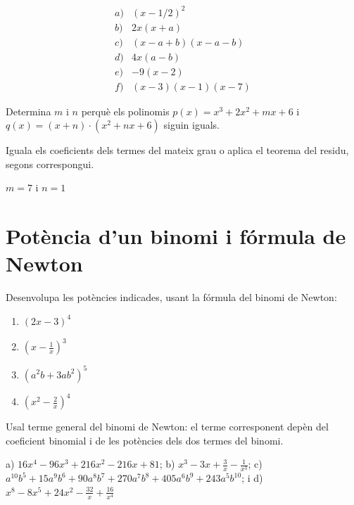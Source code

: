 \begin{solucio}
\[
\begin{array}{ll}
a) & (x-1/2)^{2} \\
b) & 2x(x+a) \\
c) & (x-a+b)(x-a-b) \\
d) & 4x(a-b) \\
e) & -9(x-2) \\
f) & (x-3)(x-1)(x-7)
\end{array}
\]
\end{solucio}

\begin{exercici}
Determina $m$ i $n$ perquè els polinomis $p(x)=x^{3}+2x^{2}+mx+6$ i
$q(x)=(x+n)\cdot (x^{2}+nx+6)$ siguin iguals.
\end{exercici}
\begin{indicacio}
Iguala els coeficients dels termes del mateix grau o aplica el teorema del residu, segons correspongui.
\end{indicacio}

\begin{solucio}
$m=7$ i $n=1$
\end{solucio}

\section{Potència d'un binomi i fórmula de Newton}

\begin{exercici}
Desenvolupa les potències indicades, usant la fórmula del
binomi de Newton:

\begin{enumerate}
\item[a)] $(2x-3)^{4}$

\item[b)] $\left( x-\frac{1}{x}\right) ^{3}$

\item[c)] $(a^{2}b+3ab^{2})^{5}$

\item[d)] $\left( x^{2}-\frac{2}{x}\right) ^{4}$
\end{enumerate}
\end{exercici}
\begin{indicacio}
Usal terme general del binomi de Newton: el terme corresponent depèn del coeficient binomial i de les potències dels dos termes del binomi.
\end{indicacio}

\begin{solucio}
a) $16x^{4}-96x^{3}+216x^{2}-216x+81$; b) $x^{3}-3x+\frac{3}{x}
-\frac{1}{x^{3}}$; c) $
a^{10}b^{5}+15a^{9}b^{6}+90a^{8}b^{7}+270a^{7}b^{8}+405a^{6}b^{9}+243a^{5}b^{10}
$; i d) $x^{8}-8x^{5}+24x^{2}-\frac{32}{x}+\frac{16}{x^{4}}$
\end{solucio}


